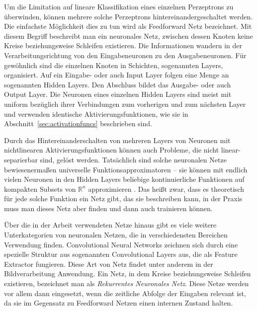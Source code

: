 Um die Limitation auf lineare Klassifikation eines einzelnen Perzeptrons zu überwinden, können mehrere solche Perzeptrons hintereinandergeschaltet werden. 
Die einfachste Möglichkeit dies zu tun wird als Feedforward Netz bezeichnet.
Mit diesem Begriff beschreibt man ein neuronales Netz, zwischen dessen Knoten keine Kreise beziehungsweise Schleifen existieren.
Die Informationen wandern in der Verarbeitungsrichtung von den Eingabeneuronen zu den Ausgabeneuronen.
Für gewöhnlich sind die einzelnen Knoten in Schichten, sogenannten Layers, organisiert.
Auf ein Eingabe- oder auch Input Layer folgen eine Menge an sogenannten Hidden Layers.
Den Abschluss bildet das Ausgabe- oder auch Output Layer.
Die Neuronen eines einzelnen Hidden Layers sind meist mit uniform bezüglich ihrer Verbindungen zum vorherigen und zum nächsten Layer und verwenden identische Aktivierungsfunktionen, wie sie in Abschnitt~\ref{sec:activationfuncs} beschrieben sind.

Durch das Hintereinanderschalten von mehreren Layers von Neuronen mit nichtlinearen Aktivierungsfunktionen können auch Probleme, die nicht linear-separierbar sind, gelöst werden.
Tatsächlich sind solche neuronalen Netze bewiesenermaßen universelle Funktionsapproximatoren -- 
sie können mit endlich vielen Neuronen in den Hidden Layers beliebige kontinuierliche Funktionen auf kompakten Subsets von \(\mathbb{R}^n\) approximieren \cite[Unterabschnitt 6.4.1]{Goodfellow-et-al-2016}.
Das heißt zwar, dass es theoretisch für jede solche Funktion ein Netz gibt, das sie beschreiben kann, in der Praxis muss man dieses Netz aber finden und dann auch trainieren können.

Über die in der Arbeit verwendeten Netze hinaus gibt es viele weitere Unterkategorien von neuronalen Netzen, die in verschiedensten Bereichen Verwendung finden.
Convolutional Neural Networks zeichnen sich durch eine spezielle Struktur aus sogenannten Convolutional Layers aus, die als Feature Extractor fungieren.
Diese Art von Netz findet unter anderem in der Bildverarbeitung Anwendung.
Ein Netz, in dem Kreise beziehungsweise Schleifen existieren, bezeichnet man als \textit{Rekurrentes Neuronales Netz}.
Diese Netze werden vor allem dann eingesetzt, wenn die zeitliche Abfolge der Eingaben relevant ist, 
da sie im Gegensatz zu Feedforward Netzen einen internen Zustand halten.

